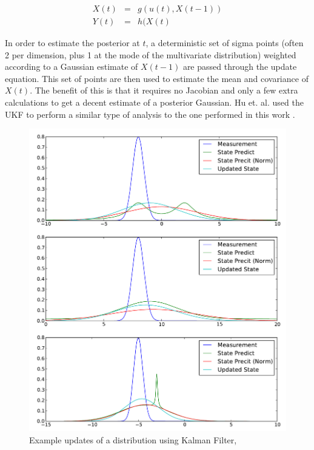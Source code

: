 \begin{eqnarray}
X(t) &=& g(u(t), X(t-1))\\
Y(t) &=& h(X(t)
\end{eqnarray}

In order to estimate the posterior at $t$, a deterministic set of sigma points 
(often 2 per dimension, plus 1 at the mode of the multivariate distribution)
weighted according to a Gaussian estimate of $X(t-1)$ are passed through
the update equation. This set of points are then used to estimate the 
mean and covariance of $X(t)$. The benefit of this is that it requires
no Jacobian and only a few extra calculations to get a decent estimate of
a posterior Gaussian. Hu et. al. used the UKF to  perform a similar type of analysis to
the one performed in this work \cite{Hu2009}. 

\begin{figure}
\includegraphics[width=16cm]{images/kalman}
\caption{Example updates of a distribution using Kalman Filter, \cite{Thrun2005}}
\label{fig:EKFWorking}
\end{figure}


